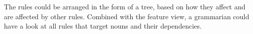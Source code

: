 \documentclass[11pt]{article}
\begin{document}
The rules could be arranged in the form of a tree, based on how they affect and are affected by other rules. Combined with the feature view, a grammarian could have a look at all rules that target nouns and their dependencies.













\end{document}
